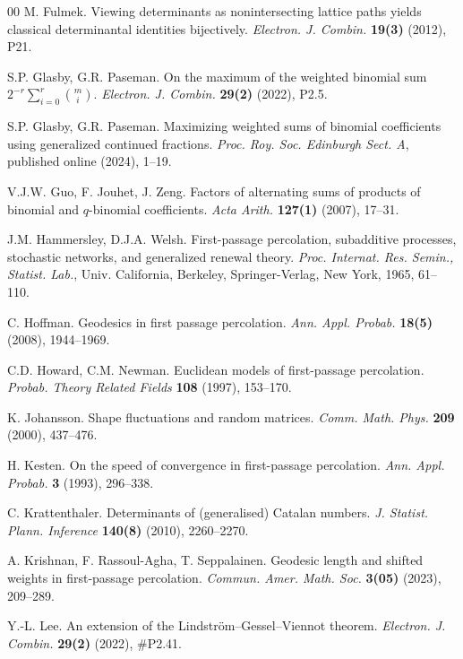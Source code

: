 \documentclass[reqno]{amsart}
\begin{document}
\begin{thebibliography}{00}
 M. Fulmek. Viewing determinants as nonintersecting 
lattice paths yields classical determinantal identities bijectively. 
{\em Electron. J. Combin.} {\bf 19(3)} (2012), P21.

 S.P. Glasby, G.R. Paseman. On the maximum 
of the weighted binomial sum $2^{-r}\sum_{i=0}^r\binom{m}{i}$. 
{\em Electron. J. Combin.} {\bf 29(2)} (2022), P2.5.

 S.P. Glasby, G.R. Paseman. Maximizing 
weighted sums of binomial coefficients using generalized continued 
fractions. {\em Proc. Roy. Soc. Edinburgh Sect. A}, published online 
(2024), 1--19.

 V.J.W. Guo, F. Jouhet, J. Zeng. Factors of 
alternating sums of products of binomial and $q$-binomial coefficients. 
{\em Acta Arith.} {\bf 127(1)} (2007), 17--31.

 J.M. Hammersley, D.J.A. Welsh. 
First-passage percolation, subadditive processes, stochastic networks, 
and generalized renewal theory. {\em Proc. Internat. Res. Semin., 
Statist. Lab.}, Univ. California, Berkeley, Springer-Verlag, New York, 
1965, 61--110.

 C. Hoffman. Geodesics in first passage percolation. 
{\em Ann. Appl. Probab.} {\bf 18(5)} (2008), 1944--1969.

 C.D. Howard, C.M. Newman. Euclidean models of 
first-passage percolation. {\em Probab. Theory Related Fields} {\bf 108} 
(1997), 153--170.

 K. Johansson. Shape fluctuations and random 
matrices. {\em Comm. Math. Phys.} {\bf 209} (2000), 437--476.

 H. Kesten. On the speed of convergence in 
first-passage percolation. {\em Ann. Appl. Probab.} {\bf 3} (1993), 
296--338.

 C. Krattenthaler. Determinants of 
(generalised) Catalan numbers. {\em J. Statist. Plann. Inference} 
{\bf 140(8)} (2010), 2260--2270.

 A. Krishnan, 
F. Rassoul-Agha, T. Seppalainen. Geodesic length and shifted weights in 
first-passage percolation. {\em Commun. Amer. Math. Soc.} {\bf 3(05)} 
(2023), 209--289.

 Y.-L. Lee. An extension of the 
Lindstr\"om--Gessel--Viennot theorem. {\em Electron. J. Combin.} 
{\bf 29(2)} (2022), \#P2.41.


\end{thebibliography}
\end{document}
